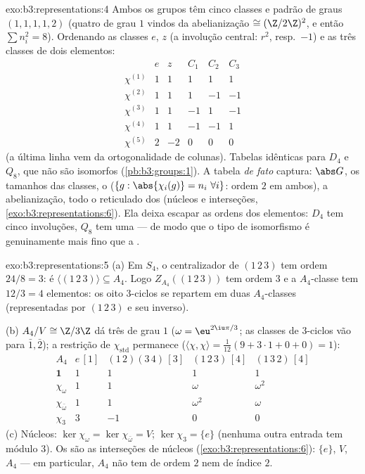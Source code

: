 \begin{solution}{exo:b3:representations:4}
Ambos os grupos têm cinco classes e padrão de graus $(1,1,1,1,2)$
(quatro de grau $1$ vindos da abelianização $\cong (\Z/2\Z)^2$,
e então $\sum n_i^2 = 8$). Ordenando as classes $e$, $z$ (a
involução central: $r^2$, resp.\ $-1$) e as três
classes de dois elementos:
\[
\begin{array}{c|ccccc}
& e & z & C_1 & C_2 & C_3\\
\hline
\chi^{(1)} & 1 & 1 & 1 & 1 & 1\\
\chi^{(2)} & 1 & 1 & 1 & -1 & -1\\
\chi^{(3)} & 1 & 1 & -1 & 1 & -1\\
\chi^{(4)} & 1 & 1 & -1 & -1 & 1\\
\chi^{(5)} & 2 & -2 & 0 & 0 & 0
\end{array}
\]
(a última linha vem da ortogonalidade de colunas). Tabelas idênticas para
$D_4$ e $Q_8$, que não são isomorfos
(\cref{pb:b3:groups:1}). A tabela \emph{de fato} captura: $\abs
G$, os tamanhos das classes, o  ($\{g : \abs{\chi_i(g)} = n_i\
\forall i\}$: ordem $2$ em ambos), a abelianização, todo o
reticulado dos  (núcleos e interseções,
\cref{exo:b3:representations:6}). Ela deixa escapar as ordens dos
elementos: $D_4$ tem cinco involuções, $Q_8$ tem uma --- de
modo que o tipo de isomorfismo é genuinamente mais fino que a
.
\end{solution}

\begin{solution}{exo:b3:representations:5}
(a) Em $S_4$, o centralizador de $(1\,2\,3)$ tem ordem $24/8 =
3$: é $\langle(1\,2\,3)\rangle \subseteq A_4$. Logo
$Z_{A_4}((1\,2\,3))$ tem ordem $3$ e a $A_4$-classe tem $12/3
= 4$ elementos: os oito $3$-ciclos se repartem em duas $A_4$-classes
(representadas por $(1\,2\,3)$ e seu inverso).

(b) $A_4/V \cong \Z/3\Z$ dá três  de grau $1$
($\omega = \eu^{2\iu\pi/3}$; as classes de $3$-ciclos vão para
$\bar1, \bar2$); a restrição de $\chi_{\mathrm{std}}$
permanece  ($\langle\chi,\chi\rangle = \frac1{12}(9 + 3
\cdot 1 + 0 + 0) = 1$):
\[
\begin{array}{c|cccc}
A_4 & e\,[1] & (1\,2)(3\,4)\,[3] & (1\,2\,3)\,[4] &
(1\,3\,2)\,[4]\\
\hline
\mathbf 1 & 1 & 1 & 1 & 1\\
\chi_\omega & 1 & 1 & \omega & \omega^2\\
\chi_{\bar\omega} & 1 & 1 & \omega^2 & \omega\\
\chi_3 & 3 & -1 & 0 & 0
\end{array}
\]
(c) Núcleos: $\ker\chi_\omega = \ker\chi_{\bar\omega} = V$;
$\ker\chi_3 = \{e\}$ (nenhuma outra entrada tem módulo $3$). Os
 são as interseções de núcleos
(\cref{exo:b3:representations:6}): $\{e\}$, $V$, $A_4$ --- em
particular, $A_4$ não tem  de ordem $2$ nem de índice
$2$.
\end{solution}

